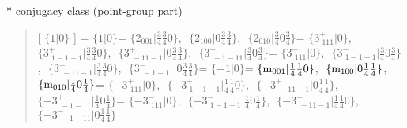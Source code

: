 \documentclass[fleqn,10pt,landscape]{jsarticle}
\begin{document}
* conjugacy class (point-group part)
\begin{quote}
[ $\{1|0\}$ ] = \quad $\{1|0\}$ = \quad $\{2{}_{001}|\frac{3}{4} \frac{3}{4} 0\}$,\,\, $\{2{}_{100}|0 \frac{3}{4} \frac{3}{4}\}$,\,\, $\{2{}_{010}|\frac{3}{4} 0 \frac{3}{4}\}$\newline[ $\{3^{+}_{\,\,111}|0\}$ ] = \quad $\{3^{+}_{\,\,111}|0\}$,\,\, $\{3^{+}_{\,\,1-1-1}|\frac{3}{4} \frac{3}{4} 0\}$,\,\, $\{3^{+}_{\,\,-11-1}|0 \frac{3}{4} \frac{3}{4}\}$,\,\, $\{3^{+}_{\,\,-1-11}|\frac{3}{4} 0 \frac{3}{4}\}$\newline[ $\{3^{-}_{\,\,111}|0\}$ ] = \quad $\{3^{-}_{\,\,111}|0\}$,\,\, $\{3^{-}_{\,\,1-1-1}|\frac{3}{4} 0 \frac{3}{4}\}$,\,\, $\{3^{-}_{\,\,-11-1}|\frac{3}{4} \frac{3}{4} 0\}$,\,\, $\{3^{-}_{\,\,-1-11}|0 \frac{3}{4} \frac{3}{4}\}$\newline[ $\{-1|0\}$ ] = \quad $\{-1|0\}$ = \quad $\{{\rm m}_{001}|\frac{1}{4} \frac{1}{4} 0\}$,\,\, $\{{\rm m}_{100}|0 \frac{1}{4} \frac{1}{4}\}$,\,\, $\{{\rm m}_{010}|\frac{1}{4} 0 \frac{1}{4}\}$\newline[ $\{-3^{+}_{\,\,111}|0\}$ ] = \quad $\{-3^{+}_{\,\,111}|0\}$,\,\, $\{-3^{+}_{\,\,1-1-1}|\frac{1}{4} \frac{1}{4} 0\}$,\,\, $\{-3^{+}_{\,\,-11-1}|0 \frac{1}{4} \frac{1}{4}\}$,\,\, $\{-3^{+}_{\,\,-1-11}|\frac{1}{4} 0 \frac{1}{4}\}$\newline[ $\{-3^{-}_{\,\,111}|0\}$ ] = \quad $\{-3^{-}_{\,\,111}|0\}$,\,\, $\{-3^{-}_{\,\,1-1-1}|\frac{1}{4} 0 \frac{1}{4}\}$,\,\, $\{-3^{-}_{\,\,-11-1}|\frac{1}{4} \frac{1}{4} 0\}$,\,\, $\{-3^{-}_{\,\,-1-11}|0 \frac{1}{4} \frac{1}{4}\}$\newline
\end{quote}
\end{document}
